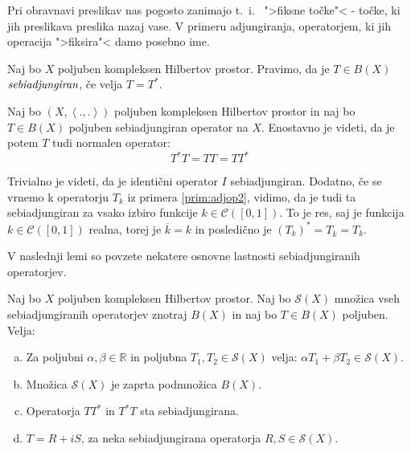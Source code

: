 \documentclass[mat2]{matdelo}
\newcommand{\R}{\mathbb{R}}
\newcommand{\pojem}[1]{\ensuremath{\emph{#1}}}
\newcommand{\Sp}[2]{\ensuremath{\left<#1, #2\right>}}
\begin{document}
			Pri obravnavi preslikav nas pogosto zanimajo t.~i.~ ">fiksne točke"< - točke, ki jih preslikava preslika nazaj vase. V primeru adjungiranja, operatorjem, ki jih operacija ">fiksira"< damo posebno ime.
			
			\begin{definicija}
				\label{def:sebiadjop}
				Naj bo $X$ poljuben kompleksen Hilbertov prostor. Pravimo, da je $T\in B(X)$ \pojem{sebiadjungiran}, če velja $T = T^*$.
			\end{definicija}
			
			\begin{opomba}
				\label{opomb:sebiadjsonormal}
				Naj bo $(X, \Sp{.}{.})$ poljuben kompleksen Hilbertov prostor in naj bo $T\in B(X)$ poljuben sebiadjungiran operator na $X$. Enostavno je videti, da je potem $T$ tudi normalen operator: $$T^*T = TT = TT^*$$
			\end{opomba}
			
			\begin{primer}
				\label{prim:sebiadjop}
				Trivialno je videti, da je identični operator $I$ sebiadjungiran. Dodatno, če se vrnemo k operatorju $T_k$ iz primera \ref{prim:adjop2}, vidimo, da je tudi ta sebiadjungiran za vsako izbiro funkcije $k\in\mathcal{C}([0, 1])$. To je res, saj je funkcija $k\in\mathcal{C}([0, 1])$ realna, torej je $\overline{k} = k$ in posledično je $(T_k)^* = T_{\overline{k}} = T_k$.
				
			\end{primer}
			
			V naslednji lemi so povzete nekatere osnovne lastnosti sebiadjungiranih operatorjev.
			
			\begin{lema}
				\label{lem:sebiadjlast}
				Naj bo $X$ poljuben kompleksen Hilbertov prostor. Naj bo $\mathcal{S}(X)$ množica vseh sebiadjungiranih operatorjev znotraj $B(X)$ in naj bo $T\in B(X)$ poljuben. Velja:
				\begin{enumerate}[a)]
					\item Za poljubni $\alpha, \beta \in \R$ in poljubna $T_1, T_2 \in \mathcal{S}(X)$ velja: $\alpha T_1 + \beta T_2 \in \mathcal{S}(X)$.
					\item Množica $\mathcal{S}(X)$ je zaprta podmnožica $B(X)$.
					\item Operatorja $TT^*$ in $T^*T$ sta sebiadjungirana.
					\item $T = R + iS$, za neka sebiadjungirana operatorja $R, S \in \mathcal{S}(X)$.
				\end{enumerate}
			\end{lema}
			
\end{document}
